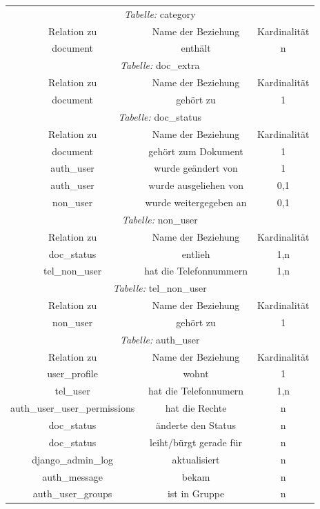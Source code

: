 \begin{longtable}{@{}ccc@{}}
  \toprule
  \multicolumn{3}{c}{\emph{Tabelle:} category} \\
  Relation zu & Name der Beziehung & Kardinalität \\
  \cmidrule(lr){1-1}\cmidrule(lr){2-2}\cmidrule(lr){3-3}
  document & enthält & n \\

  \toprule
  \multicolumn{3}{c}{\emph{Tabelle:} doc\_extra} \\
  Relation zu & Name der Beziehung & Kardinalität \\
  \cmidrule(lr){1-1}\cmidrule(lr){2-2}\cmidrule(lr){3-3}
  document & gehört zu & 1 \\

  \toprule
  \multicolumn{3}{c}{\emph{Tabelle:} doc\_status} \\
  Relation zu & Name der Beziehung & Kardinalität \\
  \cmidrule(lr){1-1}\cmidrule(lr){2-2}\cmidrule(lr){3-3}
  document & gehört zum Dokument & 1\\
  auth\_user & wurde geändert von & 1\\
  auth\_user & wurde ausgeliehen von & 0,1\\
  non\_user & wurde weitergegeben an & 0,1\\

  \toprule
  \multicolumn{3}{c}{\emph{Tabelle:} non\_user} \\
  Relation zu & Name der Beziehung & Kardinalität \\
  \cmidrule(lr){1-1}\cmidrule(lr){2-2}\cmidrule(lr){3-3}
  doc\_status & entlieh & 1,n\\
  tel\_non\_user & hat die Telefonnummern & 1,n\\

  \toprule
  \multicolumn{3}{c}{\emph{Tabelle:} tel\_non\_user} \\
  Relation zu & Name der Beziehung & Kardinalität \\
  \cmidrule(lr){1-1}\cmidrule(lr){2-2}\cmidrule(lr){3-3}
  non\_user & gehört zu & 1 \\

  \toprule
  \multicolumn{3}{c}{\emph{Tabelle:} auth\_user} \\
  Relation zu & Name der Beziehung & Kardinalität \\
  \cmidrule(lr){1-1}\cmidrule(lr){2-2}\cmidrule(lr){3-3}
  user\_profile & wohnt & 1\\
  tel\_user & hat die Telefonnumern & 1,n\\
  auth\_user\_user\_permissions & hat die Rechte & n\\
  doc\_status & änderte den Status & n\\  
  doc\_status & leiht/bürgt gerade für & n\\
  django\_admin\_log & aktualisiert & n\\
  auth\_message & bekam & n\\
  auth\_user\_groups & ist in Gruppe & n\\


\end{longtable}
